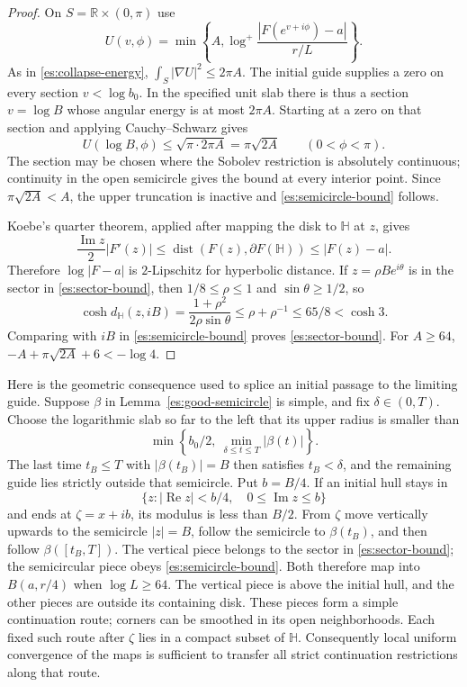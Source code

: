 \documentclass[11pt]{article}
\theoremstyle{definition}
\theoremstyle{remark}
\numberwithin{equation}{section}
\begin{document}
\begin{proof}
On $S=\mathbb R\times(0,\pi)$ use
\[
 U(v,\phi)=\min\left\{A,
          \log^+\frac{|F(e^{v+i\phi})-a|}{r/L}\right\}.
\]
As in \eqref{es:collapse-energy},
$\int_S|\nabla U|^2\le2\pi A$.  The initial guide supplies a zero on
every section $v<\log b_0$.  In the specified unit slab there is thus
a section $v=\log B$ whose angular energy is at most $2\pi A$.
Starting at a zero on that section and applying Cauchy--Schwarz gives
\[
 U(\log B,\phi)\le\sqrt{\pi\cdot2\pi A}
       =\pi\sqrt{2A}\qquad(0<\phi<\pi).
\]
The section may be chosen where the Sobolev restriction is absolutely
continuous; continuity in the open semicircle gives the bound at every
interior point.  Since $\pi\sqrt{2A}<A$, the upper truncation is
inactive and \eqref{es:semicircle-bound} follows.

Koebe's quarter theorem, applied after mapping the disk to
$\mathbb H$ at $z$, gives
\[
 \frac{\operatorname{Im}z}{2}|F'(z)|
 \le\operatorname{dist}(F(z),\partial F(\mathbb H))
 \le |F(z)-a|.
\]
Therefore $\log|F-a|$ is $2$-Lipschitz for hyperbolic distance.
If $z=\rho Be^{i\theta}$ is in the sector in
\eqref{es:sector-bound}, then $1/8\le\rho\le1$ and
$\sin\theta\ge1/2$, so
\[
 \cosh d_{\mathbb H}(z,iB)
   =\frac{1+\rho^2}{2\rho\sin\theta}
   \le\rho+\rho^{-1}\le65/8<\cosh3.
\]
Comparing with $iB$ in \eqref{es:semicircle-bound} proves
\eqref{es:sector-bound}.  For $A\ge64$,
$-A+\pi\sqrt{2A}+6<-\log4$.
\end{proof}

Here is the geometric consequence used to splice an initial passage
to the limiting guide.  Suppose $\beta$ in
Lemma~\ref{es:good-semicircle} is simple, and fix $\delta\in(0,T)$.
Choose the logarithmic slab so far to the left that its upper radius
is smaller than
\[
 \min\left\{b_0/2,\ \min_{\delta\le t\le T}|\beta(t)|\right\}.
\]
The last time $t_B\le T$ with $|\beta(t_B)|=B$ then satisfies
$t_B<\delta$, and the remaining guide lies strictly outside that
semicircle.  Put $b=B/4$.  If an initial hull stays in
\[
 \{z:|\operatorname{Re}z|<b/4,\quad
           0\le\operatorname{Im}z\le b\}
\]
and ends at $\zeta=x+ib$, its modulus is less than $B/2$.
From $\zeta$ move vertically upwards to the semicircle $|z|=B$,
follow the semicircle to $\beta(t_B)$, and then follow
$\beta([t_B,T])$.  The vertical piece belongs to the sector in
\eqref{es:sector-bound}; the semicircular piece obeys
\eqref{es:semicircle-bound}.  Both therefore map into $B(a,r/4)$
when $\log L\ge64$.  The vertical piece is above the initial hull,
and the other pieces are outside its containing disk.  These pieces
form a simple continuation route; corners can be smoothed in its
open neighborhoods.  Each fixed such route after $\zeta$ lies in a
compact subset of $\mathbb H$.  Consequently local uniform
convergence of the maps is sufficient to transfer all strict
continuation restrictions along that route.
\end{document}
